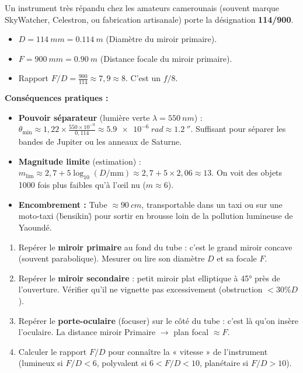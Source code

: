 \documentclass[11pt]{article}
\begin{document}
\begin{exemplebox}
Un instrument très répandu chez les amateurs camerounais (souvent marque SkyWatcher, Celestron, ou fabrication artisanale) porte la désignation \textbf{114/900}.
\begin{itemize}
    \item $D = \SI{114}{mm} = \SI{0,114}{m}$ (Diamètre du miroir primaire).
    \item $F = \SI{900}{mm} = \SI{0,90}{m}$ (Distance focale du miroir primaire).
    \item Rapport $F/D = \frac{900}{114} \approx 7,9 \approx 8$. C'est un \textbf{$f/8$}.
\end{itemize}
\textbf{Conséquences pratiques :}
\begin{itemize}
    \item \textbf{Pouvoir séparateur} (lumière verte $\lambda = \SI{550}{nm}$) : $\theta_{\text{min}} \approx 1,22 \times \frac{550 \times 10^{-9}}{0,114} \approx \SI{5,9e-6}{rad} \approx \SI{1,2}{''}$. Suffisant pour séparer les bandes de Jupiter ou les anneaux de Saturne.
    \item \textbf{Magnitude limite} (estimation) : $m_{\text{lim}} \approx 2,7 + 5 \log_{10}(D/\text{mm}) \approx 2,7 + 5 \times 2,06 \approx 13$. On voit des objets 1000 fois plus faibles qu'à l'œil nu ($m \approx 6$).
    \item \textbf{Encombrement :} Tube $\approx \SI{90}{cm}$, transportable dans un taxi ou sur une moto-taxi (\"bensikin\") pour sortir en brousse loin de la pollution lumineuse de Yaoundé.
\end{itemize}
\end{exemplebox}

\begin{methode}
\begin{enumerate}
    \item Repérer le \textbf{miroir primaire} au fond du tube : c'est le grand miroir concave (souvent parabolique). Mesurer ou lire son diamètre $D$ et sa focale $F$.
    \item Repérer le \textbf{miroir secondaire} : petit miroir plat elliptique à 45° près de l'ouverture. Vérifier qu'il ne vignette pas excessivement (obstruction $< 30\% D$).
    \item Repérer le \textbf{porte-oculaire} (focuser) sur le côté du tube : c'est là qu'on insère l'oculaire. La distance miroir Primaire $\to$ plan focal $\approx F$.
    \item Calculer le rapport $F/D$ pour connaître la « vitesse » de l'instrument (lumineux si $F/D < 6$, polyvalent si $6 < F/D < 10$, planétaire si $F/D > 10$).
\end{enumerate}
\end{methode}
\end{document}

